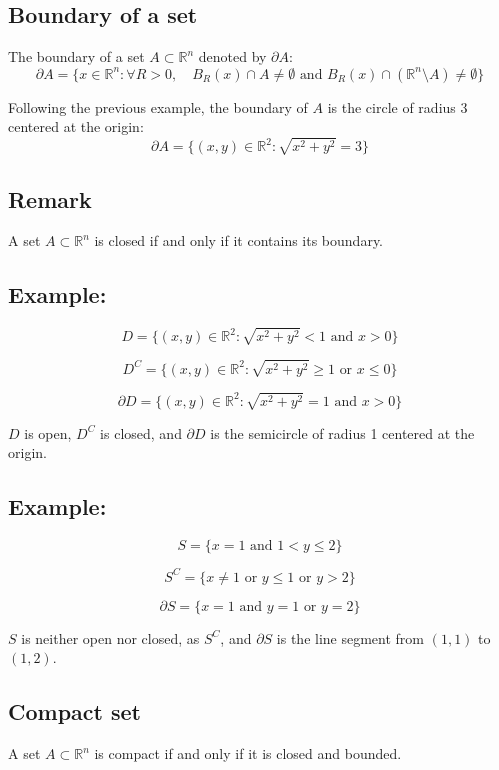 \documentclass[11pt]{article}
\begin{document}
\subsection{Boundary of a set}
The boundary of a set $A \subset \mathbb{R}^n$ denoted by $\partial A$:
\[
\partial A = \{ x \in \mathbb{R}^n : \forall R > 0, \quad B_R(x) \cap A \neq \emptyset \text{ and } B_R(x) \cap (\mathbb{R}^n \setminus A) \neq \emptyset \}
\]

Following the previous example, the boundary of $A$ is the circle of radius 3 centered at the origin:
\[
\partial A = \{ (x,y) \in \mathbb{R}^2 : \sqrt{x^2 + y^2} = 3 \}
\]

\subsection*{Remark}
A set $A \subset \mathbb{R}^n$ is closed if and only if it contains its boundary.

\subsection*{Example:}
\[
D = \{(x,y) \in \mathbb{R}^2 : \sqrt{x^2 + y^2} < 1 \text{ and } x > 0\}
\]

\[
D^C = \{(x,y) \in \mathbb{R}^2 : \sqrt{x^2 + y^2} \geq 1 \text{ or } x \leq 0\}
\]

\[
\partial D = \{(x,y) \in \mathbb{R}^2 : \sqrt{x^2 + y^2} = 1 \text{ and } x > 0\}
\]

$D$ is open, $D^C$ is closed, and $\partial D$ is the semicircle of radius 1 centered at the origin.

\subsection*{Example:}
\[
S = \{x = 1 \text{ and } 1 < y \leq 2\}
\]

\[
S^C = \{x \neq 1 \text{ or } y \leq 1 \text{ or } y > 2\}
\]

\[
\partial S = \{x = 1 \text{ and } y = 1 \text{ or } y = 2\}
\]

$S$ is neither open nor closed, as $S^C$, and $\partial S$ is the line segment from $(1,1)$ to $(1,2)$.

\subsection{Compact set}   
A set $A \subset \mathbb{R}^n$ is compact if and only if it is closed and bounded.
\end{document}
